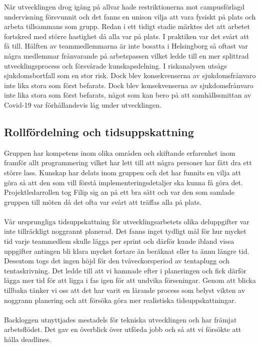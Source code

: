 \documentclass[12pt]{article}
\begin{document}
När utvecklingen drog igång på allvar hade restriktionerna mot campusförlagd undervisning försvunnit och det fanns en unison vilja att vara fysiskt på plats och arbeta tillsammans som grupp. Redan i ett tidigt stadie märktes det att arbetet fortskred med större hastighet då alla var på plats. I praktiken var det svårt att få till. Hälften av teammedlemmarna är inte bosatta i Helsingborg så oftast var några medlemmar frånvarande på arbetspassen vilket ledde till en mer splittrad utvecklingsprocess och försvårade kunskapsdelning. I riskanalysen utsågs sjukdomsbortfall som en stor risk. Dock blev konsekvenserna av sjukdomsfrånvaro inte lika stora som först befarats. Dock blev konsekvenserna av sjukdomsfrånvaro inte lika stora som först befarats, något som kan bero på att samhällssmittan av Covid-19 var förhållandevis låg under utvecklingen.

\subsection{Rollfördelning och tidsuppskattning}

Gruppen har kompetens inom olika områden och skiftande erfarenhet inom framför allt programmering vilket har lett till att några personer har fått dra ett större lass. Kunskap har delats inom gruppen och det har funnits en vilja att göra så att den som vill förstå implementeringsdetaljer ska kunna få göra det. Projektledarrollen tog Filip sig an på ett bra sätt och var den som samlade gruppen till möten då det ofta var svårt att träffas alla på plats.\\\\
Vår ursprungliga tidsuppskattning för utvecklingsarbetets olika deluppgifter var inte tillräckligt noggrannt planerad. Det fanns inget tydligt mål för hur mycket tid varje teammedlem skulle lägga per sprint och därför kunde ibland vissa uppgifter antingen bli klara mycket fortare än beräknat eller ta ännu längre tid. Dessutom togs det ingen höjd för den tvåveckorsperiod av tentaplugg och tentaskrivning. Det ledde till att vi hamnade efter i planeringen och fick därför lägga mer tid för att ligga i fas igen för att undvika förseningar. Genom att blicka tillbaka tänker vi oss att det har varit en lärande process som belyst vikten av noggrann planering och att försöka göra mer realistiska tidsuppskattningar. \\\\
Backloggen utnyttjades mestadels för tekniska utvecklingen och har främjat arbetsflödet. Det gav en överblick över utförda jobb och så att vi försökte att hålla deadlines.\\\
\end{document}
